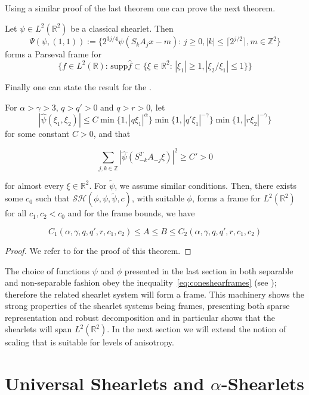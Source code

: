 Using a similar proof of the last theorem one can prove the next theorem.

\begin{thm}
Let $\psi\in L^2(\mathbb{R}^2)$ be a classical shearlet. Then 
$$
\Psi(\psi,(1,1)):=\{2^{3j/4}\psi(S_kA_jx-m)\text{: }j\geq 0,|k|\leq\lceil 2^{j/2}\rceil,m\in\mathbb{Z}^2\}
$$
forms a Parseval frame for 
$$
\{f\in L^2(\mathbb{R})\text{:  supp}\hat{f}\subset\{\xi\in\mathbb{R}^2\text{:  }|\xi_1|\geq 1,|\xi_2/\xi_1|\leq 1\}\}
$$
\end{thm}

Finally one can state the result for the .

\begin{thm}
For $\alpha >\gamma>3$, $q>q'>0$ and $q>r>0$, let 
\begin{equation}
\label{eq:coneshearframes}
|\hat{\psi}(\xi_1,\xi_2)|\leq C\min\{1,|q\xi_1|^{\alpha}\}\min\{1,|q'\xi_1|^{-\gamma}\}\min\{1,|r\xi_2|^{-\gamma}\}
\end{equation}
for some constant $C>0$, and that

$$
\sum_{j,k\in\mathbb{Z}}|\hat{\psi}(S^T_{-k}A_{-j}\xi)|^2\geq C'>0
$$

for almost every $\xi\in\mathbb{R}^2$. For $\tilde{\psi}$, we assume similar conditions. Then, there exists some $c_0$ such that $\mathcal{SH}(\phi,\psi,\tilde{\psi},c)$, with suitable $\phi$, forms a frame for $L^2(\mathbb{R}^2)$ for all $c_1,c_2<c_0$ and for the frame bounds, we have 

$$
C_1(\alpha,\gamma,q,q',r,c_1,c_2)\leq A\leq B\leq C_2(\alpha,\gamma,q,q',r,c_1,c_2)
$$

\end{thm}
\begin{proof}
We refer to \cite{FirstShearlets} for the proof of this theorem. 
\end{proof}

The choice of functions $\psi$ and $\phi$ presented in the last section in both separable and non-separable fashion obey the inequality~\ref{eq:coneshearframes} (see \cite{Nonseparableshear}); therefore the related shearlet system will form a frame. This machinery shows the strong properties of the shearlet systems being frames, presenting both sparse representation and robust decomposition and in particular shows that the shearlets will span $L^2(\mathbb{R}^2)$. In the next section we will extend the notion of scaling that is suitable for levels of anisotropy. 

\section{Universal Shearlets and $\alpha$-Shearlets}
\label{sec:AlphaShearlets}

